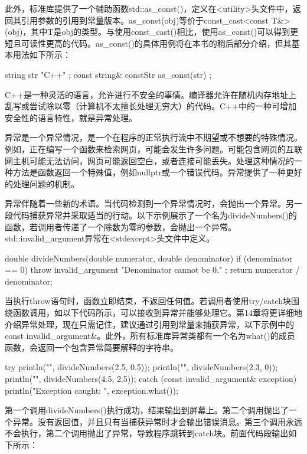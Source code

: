 此外，标准库提供了一个辅助函数std::as\_const()，定义在<utility>头文件中，返回其引用参数的引用到常量版本。as\_const(obj)等价于const\_cast<const T\&>(obj)，其中T是obj的类型。与使用const\_cast()相比，使用as\_const()可以得到更短且可读性更高的代码。as\_const()的具体用例将在本书的稍后部分介绍，但其基本用法如下所示：

\begin{cpp}
string str { "C++" };
const string& constStr { as_const(str) };
\end{cpp}


C++是一种灵活的语言，允许进行不安全的事情。编译器允许在随机内存地址上乱写或尝试除以零（计算机不太擅长处理无穷大）的代码。C++中的一种可增加安全性的语言特性，就是异常处理。

异常是一个异常情况，是一个在程序的正常执行流中不期望或不想要的特殊情况。例如，正在编写一个函数来检索网页，可能会发生许多问题。可能包含网页的互联网主机可能无法访问，网页可能返回空白，或者连接可能丢失。处理这种情况的一种方法是函数返回一个特殊值，例如nullptr或一个错误代码。异常提供了一种更好的处理问题的机制。

异常伴随着一些新的术语。当代码检测到一个异常情况时，会抛出一个异常。另一段代码捕获异常并采取适当的行动。以下示例展示了一个名为divideNumbers()的函数，若调用者传递了一个除数为零的参数，会抛出一个异常。std::invalid\_argument异常在<stdexcept>头文件中定义。

\begin{cpp}
double divideNumbers(double numerator, double denominator)
{
    if (denominator == 0) {
        throw invalid_argument { "Denominator cannot be 0." };
    }
    return numerator / denominator;
}
\end{cpp}


当执行throw语句时，函数立即结束，不返回任何值。若调用者使用try/catch块围绕函数调用，如以下代码所示，可以接收到异常并能够处理它。第14章将更详细地介绍异常处理，现在只需记住，建议通过引用到常量来捕获异常，以下示例中的const invalid\_argument\&。此外，所有标准库异常类都有一个名为what()的成员函数，会返回一个包含异常简要解释的字符串。

\begin{cpp}
try {
    println("{}", divideNumbers(2.5, 0.5));
    println("{}", divideNumbers(2.3, 0));
    println("{}", divideNumbers(4.5, 2.5));
} catch (const invalid_argument& exception) {
    println("Exception caught: {}", exception.what());
}
\end{cpp}

第一个调用divideNumbers()执行成功，结果输出到屏幕上。第二个调用抛出了一个异常。没有返回值，并且只有当捕获异常时才会输出错误消息。第三个调用永远不会执行，第二个调用抛出了异常，导致程序跳转到catch块。前面代码段输出如下所示：

